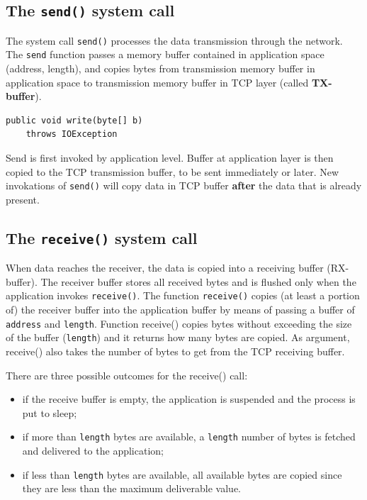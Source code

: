 \documentclass[a4paper, 11pt]{report}
\begin{document}
\subsection{The \texttt{send()} system call}

The system call \texttt{send()} processes the data transmission through the
network. The \texttt{send} function passes a memory buffer contained in
application space (address, length), and copies bytes from transmission memory
buffer in application space to transmission memory buffer in TCP layer (called
\textbf{TX-buffer}).

\begin{lstlisting}
public void write(byte[] b)
	throws IOException
\end{lstlisting}

Send is first invoked by application level. Buffer at application layer is then
copied to the TCP transmission buffer, to be sent immediately or later. New
invokations of \texttt{send()} will copy data in TCP buffer \textbf{after} the
data that is already present. 

\subsection{The \texttt{receive()} system call}

When data reaches the receiver, the data is copied into a receiving buffer
(RX-buffer). The receiver buffer stores all received bytes and is flushed only
when the application invokes \texttt{receive()}. The function
\texttt{receive()} copies (at least a portion of) the receiver buffer into the
application buffer by means of passing a buffer of \texttt{address} and
\texttt{length}. Function receive() copies bytes without exceeding the size of
the buffer (\texttt{length}) and it returns how many bytes are copied. As
argument, receive() also takes the number of bytes to get from the TCP
receiving buffer.

There are three possible outcomes for the receive() call:

\begin{itemize}
	\item if the receive buffer is empty, the application is suspended and
		the process is put to sleep;
	\item if more than \texttt{length} bytes are available, a
        \texttt{length} number of bytes is fetched and delivered to the
        application;
	\item if less than \texttt{length} bytes are available, all available
        bytes are copied since they are less than the maximum deliverable
        value.
\end{itemize}
\end{document}
